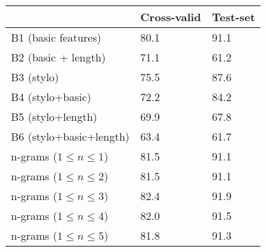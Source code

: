 \begin{tabular}{l|ll}
~ & Cross-valid & Test-set\\

\hline
B1 (basic features)     & 80.1&91.1  \\
B2 (basic + length)     & 71.1&61.2  \\
B3 (stylo)              & 75.5&87.6  \\
B4 (stylo+basic)         & 72.2&84.2  \\
B5 (stylo+length)       & 69.9&67.8  \\
B6 (stylo+basic+length)       & 63.4 &61.7 \\
\hline
n-grams ($1\le n \le 1$) &81.5  &91.1\\
n-grams ($1\le n \le 2$) &81.5  &91.1\\
n-grams ($1\le n \le 3$) &82.4  &91.9\\
n-grams ($1\le n \le 4$) &82.0  &91.5\\
n-grams ($1\le n \le 5$) &81.8  &91.3\\
\end{tabular}